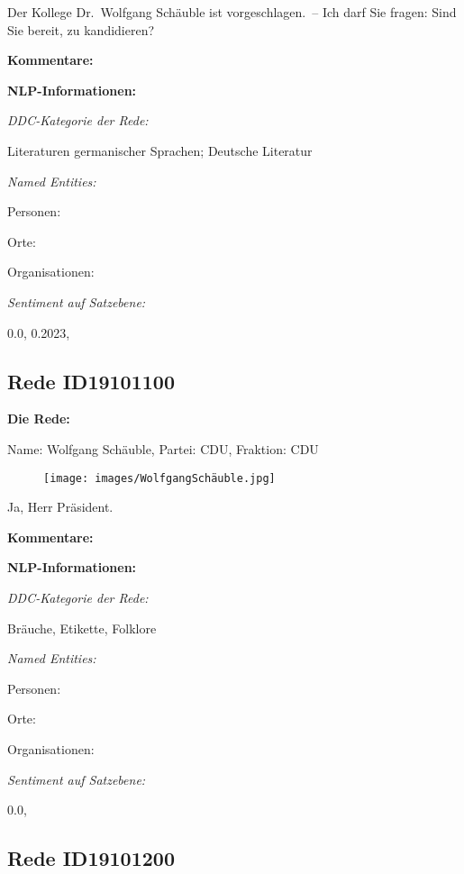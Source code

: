 \documentclass[10pt, a4paper]{report}
\begin{document}
Der Kollege Dr. Wolfgang Schäuble ist vorgeschlagen. – Ich darf Sie fragen: Sind Sie bereit, zu kandidieren? 

\textbf{Kommentare:}



\textbf{NLP-Informationen:}

\textit{DDC-Kategorie der Rede:}

Literaturen germanischer Sprachen; Deutsche Literatur

\textit{Named Entities:}

Personen:



Orte:



Organisationen:



\textit{Sentiment auf Satzebene:}

0.0, 0.2023, 
\subsection{Rede ID19101100}

\textbf{Die Rede:}

Name: Wolfgang Schäuble, Partei: CDU, Fraktion: CDU

\begin{figure}[!ht]
\texttt{[image: images/WolfgangSchäuble.jpg]}
\end{figure}


Ja, Herr Präsident. 

\textbf{Kommentare:}



\textbf{NLP-Informationen:}

\textit{DDC-Kategorie der Rede:}

Bräuche, Etikette, Folklore

\textit{Named Entities:}

Personen:



Orte:



Organisationen:



\textit{Sentiment auf Satzebene:}

0.0, 
\subsection{Rede ID19101200}
\end{document}
